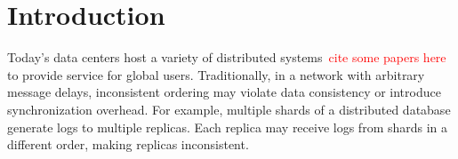 \section{Introduction}
\label{sec:intro}

Today's data centers host a variety of distributed systems~\textcolor{red}{cite some papers here} to provide service for global users. Traditionally, in a network with arbitrary message delays, inconsistent ordering may violate data consistency or introduce synchronization overhead.
For example, multiple shards of a distributed database generate logs to multiple replicas. Each replica may receive logs from shards in a different order, making replicas inconsistent.%


